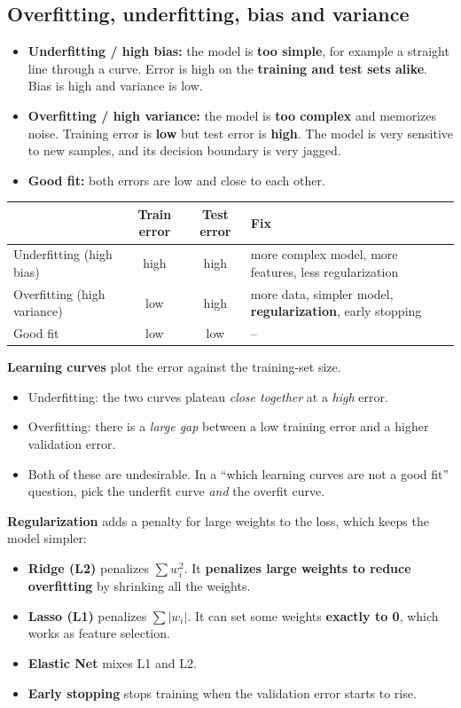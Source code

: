 \subsection{Overfitting, underfitting, bias and variance}
\begin{idea}
\begin{itemize}
  \item \textbf{Underfitting / high bias:} the model is \textbf{too simple}, for example a straight line through a curve. Error is high on the \textbf{training and test sets alike}. Bias is high and variance is low.
  \item \textbf{Overfitting / high variance:} the model is \textbf{too complex} and memorizes noise. Training error is \textbf{low} but test error is \textbf{high}. The model is very sensitive to new samples, and its decision boundary is very jagged.
  \item \textbf{Good fit:} both errors are low and close to each other.
\end{itemize}
\end{idea}
\begin{center}
\begin{tabular}{lccp{6.3cm}}
\toprule
 & Train error & Test error & Fix \\ \midrule
Underfitting (high bias) & high & high & more complex model, more features, less regularization \\
Overfitting (high variance) & low & high & more data, simpler model, \textbf{regularization}, early stopping \\
Good fit & low & low & -- \\ \bottomrule
\end{tabular}
\end{center}
\textbf{Learning curves} plot the error against the training-set size.
\begin{itemize}
  \item Underfitting: the two curves plateau \emph{close together} at a \emph{high} error.
  \item Overfitting: there is a \emph{large gap} between a low training error and a higher validation error.
  \item Both of these are undesirable. In a ``which learning curves are not a good fit'' question, pick the underfit curve \emph{and} the overfit curve.
\end{itemize}

\textbf{Regularization} adds a penalty for large weights to the loss, which keeps the model simpler:
\begin{itemize}
  \item \textbf{Ridge (L2)} penalizes $\sum w_i^2$. It \textbf{penalizes large weights to reduce overfitting} by shrinking all the weights.
  \item \textbf{Lasso (L1)} penalizes $\sum |w_i|$. It can set some weights \textbf{exactly to 0}, which works as feature selection.
  \item \textbf{Elastic Net} mixes L1 and L2.
  \item \textbf{Early stopping} stops training when the validation error starts to rise.
\end{itemize}

